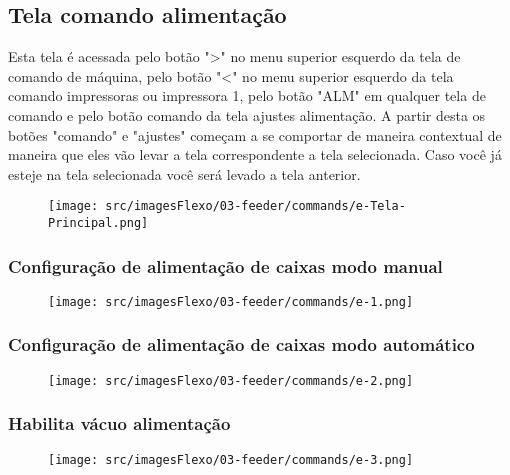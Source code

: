 \newpage
\thispagestyle{fancy}
\vspace*{\fill}
\subsection{Tela comando alimentação}
 Esta tela é acessada pelo botão "\textgreater" no menu superior esquerdo da tela de comando de máquina, pelo botão "\textless{}" no menu superior esquerdo da tela comando impressoras ou impressora 1, pelo botão "ALM" em qualquer tela de comando e pelo botão comando da tela ajustes alimentação. A partir desta os botões "comando" e "ajustes" começam a se comportar de maneira contextual de maneira que eles vão levar a tela correspondente a tela selecionada. Caso você já esteje na tela selecionada você será levado a tela anterior.
\begin{figure}[h]
  \centering
  \texttt{[image: src/imagesFlexo/03-feeder/commands/e-Tela-Principal.png]}
   \label{}
\end{figure}

\newpage
\thispagestyle{fancy}
\vspace*{\fill}
\subsubsection{\small{Configuração de alimentação de caixas modo manual}}
\begin{figure}[h]
  \centering
  \texttt{[image: src/imagesFlexo/03-feeder/commands/e-1.png]}
   \label{}
\end{figure}
\vspace*{\fill}


\newpage
\thispagestyle{fancy}
\vspace*{\fill}
\subsubsection{\small{Configuração de alimentação de caixas modo automático}}
\begin{figure}[h]
  \centering
  \texttt{[image: src/imagesFlexo/03-feeder/commands/e-2.png]}
   \label{}
\end{figure}
\vspace*{\fill}

\newpage
\thispagestyle{fancy}
\vspace*{\fill}
\subsubsection{\small{Habilita vácuo alimentação}}
\begin{figure}[h]
  \centering
  \texttt{[image: src/imagesFlexo/03-feeder/commands/e-3.png]}
   \label{}
\end{figure}
\vspace*{\fill}


